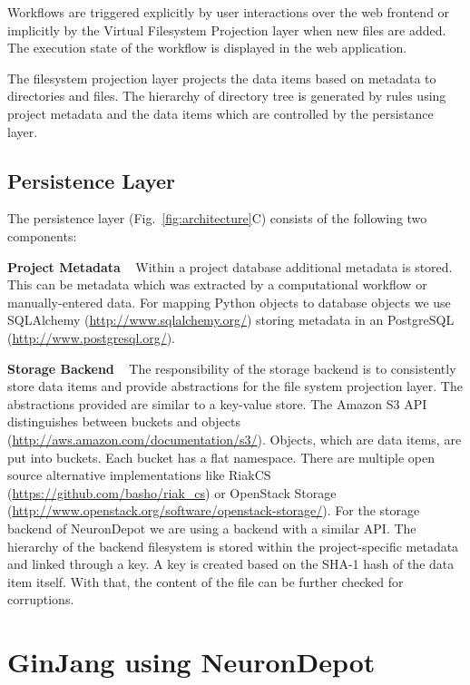 \documentclass{frontiersSCNS} %
\begin{document}
Workflows are triggered explicitly by user interactions over the web
frontend or implicitly by the Virtual Filesystem Projection layer when new
files are added. The execution state of the workflow is displayed in the web
application.

The filesystem projection layer projects the data items based on metadata to
directories and files. The hierarchy of directory tree is generated by rules
using project metadata and the data items which are controlled by the
persistance layer.

\subsection{Persistence Layer}\label{sec:persistence_layer}

The persistence layer (Fig.~\ref{fig:architecture}C) consists of the following two components:

\textbf{Project Metadata} \texttt{  } Within a project database additional
metadata is stored. This can be metadata which was extracted by a computational
workflow or manually-entered data. For mapping Python objects to database
objects we use SQLAlchemy (\url{http://www.sqlalchemy.org/}) storing metadata
in an PostgreSQL (\url{http://www.postgresql.org/}).

\textbf{Storage Backend} \texttt{  } The responsibility of the storage backend
is to consistently store data items and provide abstractions for the file
system projection layer. The abstractions provided are similar to a key-value
store. The Amazon S3 API distinguishes between buckets and objects
(\url{http://aws.amazon.com/documentation/s3/}). Objects, which are data items,
are put into buckets. Each bucket has a flat namespace. There are multiple open
source alternative implementations like RiakCS
(\url{https://github.com/basho/riak\_cs}) or OpenStack Storage
(\url{http://www.openstack.org/software/openstack-storage/}). For the storage
backend of NeuronDepot we are using a backend with a similar API. The hierarchy
of the backend filesystem is stored within the project-specific metadata and
linked through a key. A key is created based on the SHA-1 hash of the data item
itself. With that, the content of the file can be further checked for
corruptions.

\section{GinJang using NeuronDepot}
\end{document}

